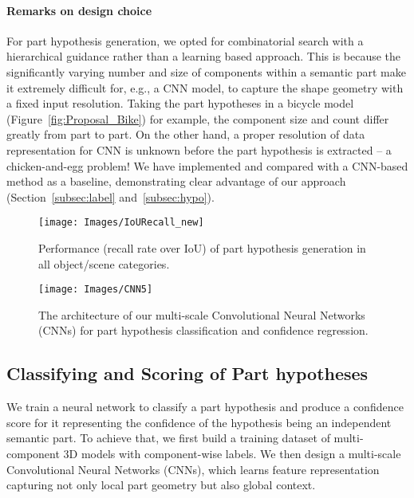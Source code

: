 \documentclass[acmtog]{acmart}
\newcommand{\kx}[1]{{\color{black}#1}}
\begin{document}
\paragraph{\textbf{Remarks on design choice}}
\kx{For part hypothesis generation, we opted for combinatorial search with a hierarchical guidance rather than a learning based approach. This is because the significantly varying number and size of components within a semantic part make it extremely difficult for, e.g., a CNN model, to capture the shape geometry with a fixed input resolution. Taking the part hypotheses in a bicycle model (Figure~\ref{fig:Proposal_Bike}) for example, the component size and count differ greatly from part to part. On the other hand, a proper resolution of data representation for CNN is unknown before the part hypothesis is extracted -- a chicken-and-egg problem! We have implemented and compared with a CNN-based method as a baseline, demonstrating clear advantage of our approach (Section~\ref{subsec:label} and~\ref{subsec:hypo}).}

\begin{figure}[!t]
  \centering
  \texttt{[image: Images/IoURecall\_new]}
  \caption{Performance (recall rate over IoU) of part hypothesis generation in all object/scene categories.}
  \label{fig:IoURecall}
\end{figure} 


\begin{figure*}[ht]
  \centering
  \texttt{[image: Images/CNN5]}
  \caption{The architecture of our multi-scale Convolutional Neural Networks (CNNs) for part hypothesis classification and confidence regression.}
  \label{fig:CNN}
\end{figure*} 
\subsection{Classifying and Scoring of Part hypotheses}
\label{sec:ranking}
We train a neural network to classify a part hypothesis and produce a confidence score for it
representing the confidence of the hypothesis being an independent semantic part.
To achieve that,
we first build a training dataset of multi-component 3D models
with component-wise labels.
We then design a multi-scale Convolutional Neural Networks (CNNs), which learns
feature representation capturing not only local part geometry but also global context.
\end{document}
